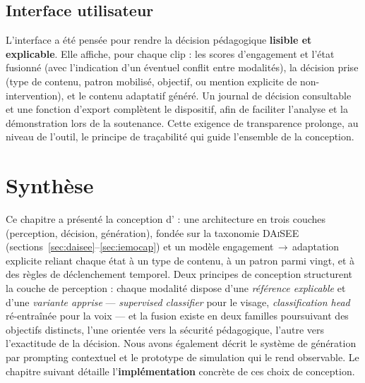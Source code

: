 \subsection{Interface utilisateur}

L'interface a été pensée pour rendre la décision pédagogique \textbf{lisible et
explicable}. Elle affiche, pour chaque clip : les scores d'engagement et l'état
fusionné (avec l'indication d'un éventuel conflit entre modalités), la décision
prise (type de contenu, patron mobilisé, objectif, ou mention explicite de
non-intervention), et le contenu adaptatif généré. Un journal de décision
consultable et une fonction d'export complètent le dispositif, afin de faciliter
l'analyse et la démonstration lors de la soutenance. Cette exigence de
transparence prolonge, au niveau de l'outil, le principe de traçabilité qui guide
l'ensemble de la conception.

\section{Synthèse}

Ce chapitre a présenté la conception d'\emolearn{} : une architecture en trois
couches (perception, décision, génération), fondée sur la taxonomie \textsc{DAiSEE}
(sections~\ref{sec:daisee}--\ref{sec:iemocap}) et un modèle engagement\,$\rightarrow$\,adaptation explicite reliant chaque état à
un type de contenu, à un patron parmi vingt, et à des règles de déclenchement
temporel. Deux principes de conception structurent la couche de perception : chaque
modalité dispose d'une \emph{référence explicable} et d'une \emph{variante apprise}
— \emph{supervised classifier} pour le visage, \emph{classification head} ré-entraînée pour la
voix — et la fusion existe en deux familles poursuivant des objectifs distincts,
l'une orientée vers la sécurité pédagogique, l'autre vers l'exactitude de la
décision. Nous avons également décrit le système de génération par prompting
contextuel et le prototype de simulation qui le rend observable. Le chapitre
suivant détaille l'\textbf{implémentation} concrète de ces choix de conception.
